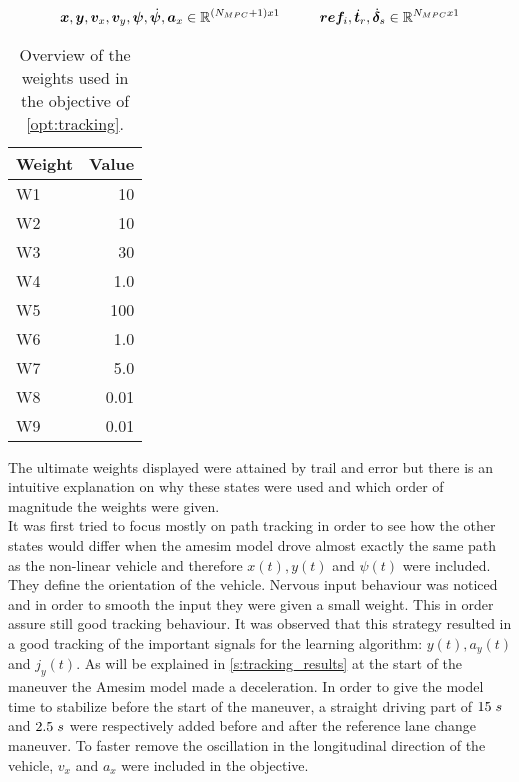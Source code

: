 \[\bm{x},\bm{y},\bm{v}_x,\bm{v}_y,\bm{\psi},\dot{\bm{\psi}},\bm{a}_x \in \mathbb{R}^{(N_{MPC}+1)x1} \hspace{10mm}\bm{ref}_{i},\dot{\bm{t}}_r,\dot{\bm{\delta}}_s \in \mathbb{R}^{N_{MPC}x1}\]


\begin{table}[h!]
	\centering
	\begin{tabular}{@{}lr@{}} 
		Weight    & Value\\ \midrule
		W1      & 10\\
		W2          & 10\\
		W3 	   & 30\\
		W4       & 1.0\\
		W5       & 100\\
		W6       & 1.0\\
		W7       & 5.0\\
		W8       & 0.01\\
		W9  & 0.01\\ \bottomrule
	\end{tabular}
	\caption{Overview of the weights used in the objective of \ref{opt:tracking}.}
	\label{tab:weights}
\end{table}

The ultimate weights displayed were attained by trail and error but there is an intuitive explanation on why these states were used and which order of magnitude the weights were given.\\
It was first tried to focus mostly on path tracking in order to see how the other states would differ when the amesim model drove almost exactly the same path as the non-linear vehicle and therefore $x(t),y(t)$ and $\psi(t)$ were included. They define the orientation of the vehicle. Nervous input behaviour was noticed and in order to smooth the input they were given a small weight. This in order assure still good tracking behaviour. It was observed that this strategy resulted in a good tracking of the important signals for the learning algorithm: $y(t), a_y(t)$ and $j_y(t)$. As will be explained in \ref{s:tracking_results} at the start of the maneuver the Amesim model made a deceleration. In order to  give the model time to stabilize before the start of the maneuver, a straight driving part of $15\hspace{1mm}s$ and $2.5\hspace{1mm}s$ were respectively added before and after the reference lane change maneuver. To faster remove the oscillation in the longitudinal direction of the vehicle, $v_x$ and $a_x$ were included in the objective.\\

